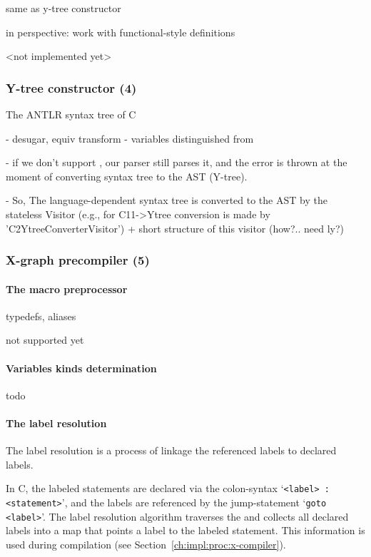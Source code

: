 same as y-tree constructor

in perspective: work with functional-style definitions

<not implemented yet>


\subsubsection{Y-tree constructor (4)}
\label{ch:impl:proc:y-constr}

The ANTLR syntax tree of C

- desugar, equiv transform
- variables distinguished from 


- if we don't support , our parser still parses it, and the error is thrown at the moment of converting syntax tree to the AST (Y-tree).

- So, The language-dependent syntax tree is converted to the AST by the stateless Visitor (e.g., for C11->Ytree conversion is made by 'C2YtreeConverterVisitor') + short structure of this visitor (how?.. need ly?)




\subsubsection{X-graph precompiler (5)}
\label{ch:impl:proc:x-pre-compiler}


\paragraph{The macro preprocessor}

typedefs, aliases

not supported yet

\paragraph{Variables kinds determination}
\label{ch:impl:proc:x-pre-compiler:var}

todo


\paragraph{The label resolution}
\label{ch:impl:proc:x-pre-compiler:label}

The label resolution is a process of linkage the referenced labels to declared labels.

In C, the labeled statements are declared via the colon-syntax `\texttt{<label> : <statement>}',
and the labels are referenced by the jump-statement `\texttt{goto <label>}'.
The label resolution algorithm traverses the \ytree{} and collects all declared labels into a map that points a label to the labeled statement. %
This information is used during compilation (see Section~\ref{ch:impl:proc:x-compiler}).

